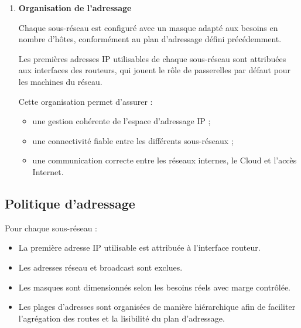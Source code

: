 \documentclass[12pt,a4paper, oneside]{memoir}
\begin{document}
\begin{enumerate}
\begin{figure}[H]
\label{fig:config_stat}
\end{figure}

Après modification du fichier de configuration, il est nécessaire de redémarrer le service réseau afin d’appliquer les changements :

\begin{verbatim}
	/etc/init.d/networking restart
\end{verbatim}

ou bien de redémarrer la machine.

\item \textbf{Organisation de l'adressage}

Chaque sous-réseau est configuré avec un masque adapté aux besoins en nombre d’hôtes, conformément au plan d’adressage défini précédemment.

Les premières adresses IP utilisables de chaque sous-réseau sont attribuées aux interfaces des routeurs, qui jouent le rôle de passerelles par défaut pour les machines du réseau.

Cette organisation permet d’assurer :

\begin{itemize}
	\item une gestion cohérente de l’espace d’adressage IP ;
	\item une connectivité fiable entre les différents sous-réseaux ;
	\item une communication correcte entre les réseaux internes, le Cloud et l’accès Internet.
\end{itemize}
\end{enumerate}
\subsection{Politique d'adressage}
Pour chaque sous-réseau :
\begin{itemize}[label*=$\star$]
	\item La première adresse IP utilisable est attribuée à l’interface routeur.
	\item Les adresses réseau et broadcast sont exclues.
	\item Les masques sont dimensionnés selon les besoins réels avec marge contrôlée.
	\item Les plages d’adresses sont organisées de manière hiérarchique afin de faciliter l’agrégation des routes et la lisibilité du plan d’adressage.
	
\end{itemize}
\end{document}
